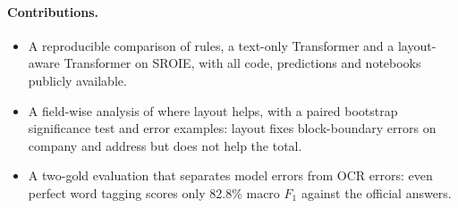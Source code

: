 \paragraph{Contributions.}
\begin{itemize}
  \item A reproducible comparison of rules, a text-only Transformer and a
        layout-aware Transformer on SROIE, with all code, predictions and
        notebooks publicly available.
  \item A field-wise analysis of where layout helps, with a paired
        bootstrap significance test and error examples: layout fixes
        block-boundary errors on company and address but does not help
        the total.
  \item A two-gold evaluation that separates model errors from OCR
        errors: even perfect word tagging scores only 82.8\% macro $F_1$
        against the official answers.
\end{itemize}
